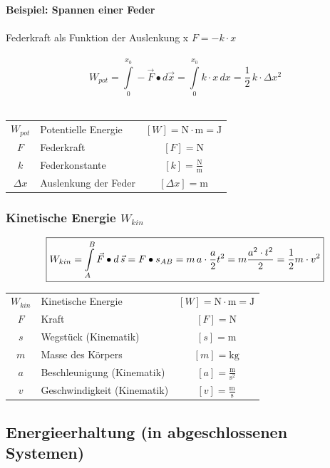 			\textbf{Beispiel: Spannen einer Feder} \\
				\\  
				Federkraft als Funktion der Auslenkung x \qquad $F = -k \cdot x$ \\
				\\
				$$ \boxed{ W_{pot} = \int \limits_0^{x_0}  - \vec{F} \bullet d \vec{x} = \int \limits_0^{x_0}  k \cdot x \, dx = \frac{1}{2} \, k \cdot \Delta x^2} $$ \\
				
			\begin{tabular}{c l c}
				$W_{pot}$ & Potentielle Energie & $[W] = \mathrm{N \cdot m = J}$ \\
				$F$ & Federkraft & $[F] = \mathrm{N} $ \\
				$k$ & Federkonstante & $[k] = \mathrm{\frac{N}{m}}$ \\
				$\Delta x$ & Auslenkung der Feder & $[\Delta x] = \mathrm{m}$ \\
			\end{tabular}

		\subsubsection{Kinetische Energie $W_{kin}$}
		
			$$ \boxed{ \normalsize{ W_{kin} = \int \limits_A^B \vec{F} \bullet d \, \vec{s} =  F \bullet s_{AB} = m \, a \cdot \frac{a}{2} t^2 = m \frac{a^2 \cdot t^2}{2} = \frac{1}{2} m \cdot v^2} }$$
			
			\begin{tabular}{c l c}
				$W_{kin}$ & Kinetische Energie & $[W] = \mathrm{N \cdot m = J}$ \\
				$F$ & Kraft & $[F] = \mathrm{N} $ \\
				$s$ & Wegstück (Kinematik) & $[s] = \mathrm{m}$ \\
				$m$ & Masse des Körpers & $[m] = \mathrm{kg}$ \\
				$a$ & Beschleunigung (Kinematik) & $[a] = \mathrm{\frac{m}{s^2}}$ \\
				$v$ & Geschwindigkeit (Kinematik) & $[v] = \mathrm{\frac{m}{s}}$ \\
			\end{tabular}

	\subsection{Energieerhaltung (in abgeschlossenen Systemen)}
	
